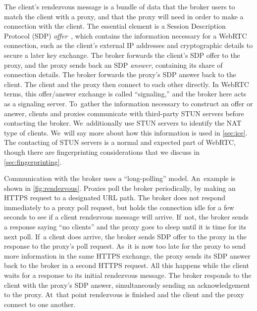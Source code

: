 \documentclass[letterpaper,twocolumn]{article}
\newcommand{\firstterm}[1]{\textit{#1}}
\begin{document}
The client's rendezvous message
is a bundle of data that the broker users to match the client with a proxy,
and that the proxy will need in order to make a connection with the client.
The essential element is a
Session Description Protocol (SDP) \firstterm{offer}~\cite{rfc8839},
which contains the information necessary for a WebRTC connection,
such as the client's external IP addresses
and cryptographic details to secure a later key exchange.
The broker forwards the client's SDP offer to the proxy,
and the proxy sends back an SDP \firstterm{answer},
containing its share of connection details.
The broker forwards the proxy's SDP answer back to the client.
The client and the proxy then connect to each other directly.
In WebRTC terms, this offer/\allowbreak answer exchange is called
``signaling,'' and the broker here acts as a signaling server.
To~gather the information necessary to construct an offer or answer,
clients and proxies communicate with third-party STUN servers
before contacting the broker.
We~additionally use STUN servers to identify the NAT type of clients.
We~will say more about how this information is used in \autoref{sec:ice}.
The contacting of STUN servers is a normal and expected part of WebRTC,
though there are fingerprinting considerations
that we discuss in \autoref{sec:fingerprinting}.

Communication with the broker uses a ``long-polling'' model.
An~example is shown in \autoref{fig:rendezvous}.
Proxies poll the broker periodically,
by making an HTTPS request to a designated URL path.
The broker does not respond immediately to a proxy poll request,
but holds the connection idle for a few seconds
to see if a client rendezvous message will arrive.
If~not, the broker sends a response saying ``no clients''
and the proxy goes to sleep until it is time for its next poll.
If~a client does arrive,
the broker sends SDP offer to the proxy
in the response to the proxy's poll request.
As~it is now too late for the proxy to send more information
in the same HTTPS exchange,
the proxy sends its SDP answer back to the broker
in a second HTTPS request.
All this happens while the client waits for a response
to its initial rendezvous message.
The broker responds to the client with the proxy's SDP answer,
simultaneously sending an acknowledgement to the proxy.
At~that point rendezvous is finished
and the client and the proxy connect to one another.
\end{document}
